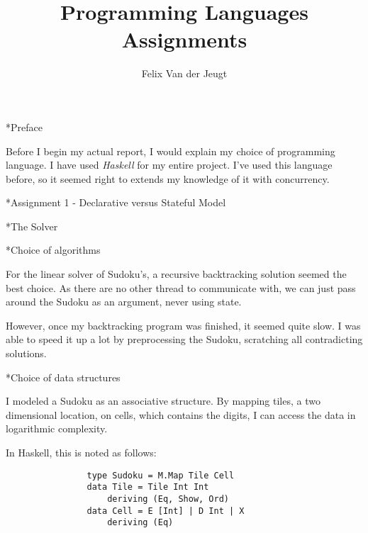 \documentclass[a4paper,12pt]{article}
\author{Felix Van der Jeugt}
\title{
    Programming Languages Assignments
}
\begin{document}
\maketitle



\begin{section}*{Preface}

    Before I begin my actual report, I would explain my choice of programming
    language. I have used \textit{Haskell} for my entire project. I've used
    this language before, so it seemed right to extends my knowledge of it with
    concurrency.

\end{section}


\begin{section}*{Assignment 1 - Declarative versus Stateful Model}


    \begin{subsection}*{The Solver}


        \begin{subsubsection}*{Choice of algorithms}

            For the linear solver of Sudoku's, a recursive backtracking solution seemed the
            best choice. As there are no other thread to communicate with, we can just pass
            around the Sudoku as an argument, never using state.

            However, once my backtracking program was finished, it seemed quite slow. I
            was able to speed it up a lot by preprocessing the Sudoku, scratching all
            contradicting solutions.

        \end{subsubsection}


        \begin{subsubsection}*{Choice of data structures}

            I modeled a Sudoku as an associative structure. By mapping tiles, a two
            dimensional location, on cells, which contains the digits, I can access the data
            in logarithmic complexity.

            In Haskell, this is noted as follows:

            \begin{lstlisting}
                type Sudoku = M.Map Tile Cell
                data Tile = Tile Int Int
                    deriving (Eq, Show, Ord)
                data Cell = E [Int] | D Int | X
                    deriving (Eq)
            \end{lstlisting}


\end{subsubsection}
\end{subsection}
\end{section}
\end{document}
